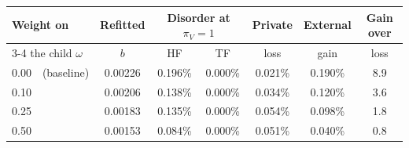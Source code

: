 \small
\begin{tabular}{@{}lcccccc@{}}
\toprule
Weight on & Refitted & \multicolumn{2}{c}{Disorder at $\pi_V=1$} & Private & External & Gain over \\
\cmidrule(lr){3-4}
the child $\omega$ & $b$ & HF & TF & loss & gain & loss \\
\midrule
0.00\ \ (baseline) & 0.00226 & 0.196\% & 0.000\% & 0.021\% & 0.190\% & 8.9 \\
0.10 & 0.00206 & 0.138\% & 0.000\% & 0.034\% & 0.120\% & 3.6 \\
0.25 & 0.00183 & 0.135\% & 0.000\% & 0.054\% & 0.098\% & 1.8 \\
0.50 & 0.00153 & 0.084\% & 0.000\% & 0.051\% & 0.040\% & 0.8 \\
\bottomrule
\end{tabular}

